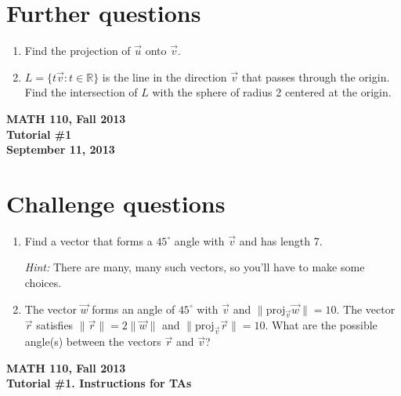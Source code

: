 \documentclass[11pt]{exam}
\newcommand{\R}{\mathbb{R}}
\newcommand{\proj}{\mathrm{proj}}
\newcommand{\mthCourse}{MATH 110}
\newcommand{\mthTerm}{Fall 2013}
\newcommand{\mthTutorialNumber}{1}
\newcommand{\mthDate}{September 11, 2013}
\begin{document}
\section*{Further questions}

\begin{enumerate}[resume]
	\item  Find the projection of $\vec u$ onto $\vec v$.

	\item $L=\{t\vec v: t\in \R\}$ is the line in the direction $\vec v$ that
	passes through the origin.  Find the intersection of $L$ with the sphere
	of radius 2 centered at the origin.
\end{enumerate}

\newpage
{
	\begin{center}
		{\bf \mthCourse, \mthTerm}\\ 
		{\bf Tutorial \#\mthTutorialNumber}\\
		{\bf \mthDate}
	\end{center}
}

\section*{Challenge questions}

\begin{enumerate}[resume]

	\item  Find a vector that forms a $45^\circ$ angle with $\vec v$ and has length 7. 

	\emph{Hint:} There are many, many such vectors, so you'll have to make some choices.

	\item The vector $\vec w$ forms an angle of $45^\circ$ with $\vec v$ and
	$\|\proj_{\vec v}\vec w\|=10$.  The vector $\vec r$ satisfies
	$\|\vec r\| = 2\|\vec w\|$ and $\|\proj_{\vec v}\vec r\|=10$.  What are the
	possible angle(s) between the vectors $\vec r$ and $\vec v$?

\end{enumerate}



\newpage
{\small
	\begin{center}
		{\bf \mthCourse, \mthTerm}\\ 
		{\bf Tutorial \#\mthTutorialNumber. Instructions for TAs}
	\end{center}
}
\end{document}

